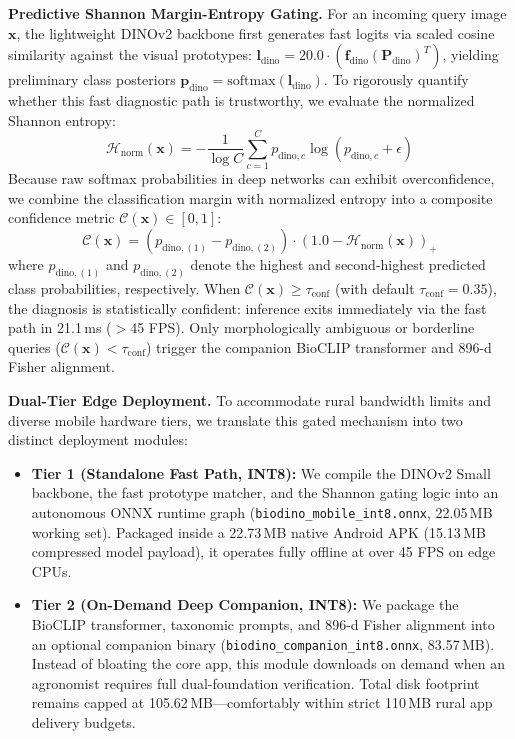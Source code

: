 \documentclass[conference]{IEEEtran}
\begin{document}
\textbf{Predictive Shannon Margin-Entropy Gating.} For an incoming query image $\mathbf{x}$, the lightweight DINOv2 backbone first generates fast logits via scaled cosine similarity against the visual prototypes: $\mathbf{l}_{\text{dino}} = 20.0 \cdot (\mathbf{f}_{\text{dino}} (\mathbf{P}_{\text{dino}})^T)$, yielding preliminary class posteriors $\mathbf{p}_{\text{dino}} = \text{softmax}(\mathbf{l}_{\text{dino}})$. To rigorously quantify whether this fast diagnostic path is trustworthy, we evaluate the normalized Shannon entropy:
\begin{equation}
\mathcal{H}_{\text{norm}}(\mathbf{x}) = -\frac{1}{\log C} \sum_{c=1}^C p_{\text{dino}, c} \log(p_{\text{dino}, c} + \epsilon)
\end{equation}
Because raw softmax probabilities in deep networks can exhibit overconfidence, we combine the classification margin with normalized entropy into a composite confidence metric $\mathcal{C}(\mathbf{x}) \in [0, 1]$:
\begin{equation}
\mathcal{C}(\mathbf{x}) = \left(p_{\text{dino}, (1)} - p_{\text{dino}, (2)}\right) \cdot \left(1.0 - \mathcal{H}_{\text{norm}}(\mathbf{x})\right)_+
\end{equation}
where $p_{\text{dino}, (1)}$ and $p_{\text{dino}, (2)}$ denote the highest and second-highest predicted class probabilities, respectively. When $\mathcal{C}(\mathbf{x}) \ge \tau_{\text{conf}}$ (with default $\tau_{\text{conf}} = 0.35$), the diagnosis is statistically confident: inference exits immediately via the fast path in 21.1\,ms ($>$45 FPS). Only morphologically ambiguous or borderline queries ($\mathcal{C}(\mathbf{x}) < \tau_{\text{conf}}$) trigger the companion BioCLIP transformer and 896-d Fisher alignment.

\textbf{Dual-Tier Edge Deployment.} To accommodate rural bandwidth limits and diverse mobile hardware tiers, we translate this gated mechanism into two distinct deployment modules:
\begin{itemize}
    \item \textbf{Tier 1 (Standalone Fast Path, INT8):} We compile the DINOv2 Small backbone, the fast prototype matcher, and the Shannon gating logic into an autonomous ONNX runtime graph (\texttt{biodino\_mobile\_int8\allowbreak .onnx}, 22.05\,MB working set). Packaged inside a 22.73\,MB native Android APK (15.13\,MB compressed model payload), it operates fully offline at over 45 FPS on edge CPUs.
    \item \textbf{Tier 2 (On-Demand Deep Companion, INT8):} We package the BioCLIP transformer, taxonomic prompts, and 896-d Fisher alignment into an optional companion binary (\texttt{biodino\_companion\_int8.onnx}, 83.57\,MB). Instead of bloating the core app, this module downloads on demand when an agronomist requires full dual-foundation verification. Total disk footprint remains capped at 105.62\,MB---comfortably within strict 110\,MB rural app delivery budgets.
\end{itemize}
\end{document}
